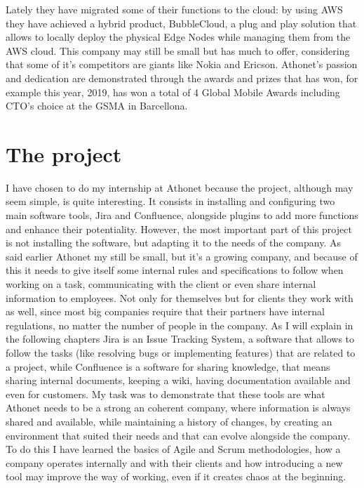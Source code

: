 	Lately they have migrated some of their functions to the cloud: by using AWS they have achieved a hybrid product, BubbleCloud, a plug and play solution that allows to locally deploy the physical Edge Nodes while managing them from the AWS cloud.
	This company may still be small but has much to offer, considering that some of it's competitors are giants like Nokia and Ericson.
	Athonet's passion and dedication are demonstrated through the awards and prizes that has won, for example this year, 2019, has won a total of 4 Global Mobile Awards including CTO’s choice at the GSMA in Barcellona.

\section{The project}

	I have chosen to do my internship at Athonet because the project, although may seem simple, is quite interesting.
	It consists in installing and configuring two main software tools, Jira and Confluence, alongside plugins to add more functions and enhance their potentiality.
	However, the most important part of this project is not installing the software, but adapting it to the needs of the company.
	As said earlier Athonet my still be small, but it's a growing company, and because of this it needs to give itself some internal rules and specifications to follow when working on a task, communicating with the client or even share internal information to employees.
	Not only for themselves but for clients they work with as well, since most big companies require that their partners have internal regulations, no matter the number of people in the company.
	As I will explain in the following chapters Jira is an Issue Tracking System, a software that allows to follow the tasks (like resolving bugs or implementing features) that are related to a project, while Confluence is a software for sharing knowledge, that means sharing internal documents, keeping a wiki, having documentation available and even for customers.
	My task was to demonstrate that these tools are what Athonet needs to be a strong an coherent company, where information is always shared and available, while maintaining a history of changes, by creating an environment that suited their needs and that can evolve alongside the company.
	To do this I have learned the basics of Agile and Scrum methodologies, how a company operates internally and with their clients and how introducing a new tool may improve the way of working, even if it creates chaos at the beginning.

